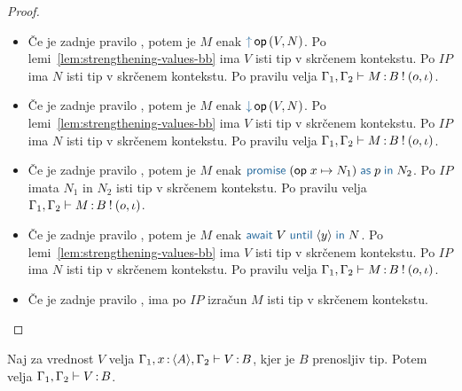 \begin{proof}
\begin{itemize}
		\item Če je zadnje pravilo , potem je $M$ enak $\tmopout{op}{V}{N}$.
		Po lemi~\ref{lem:strengthening-values-bb} ima $V$ isti tip v skrčenem kontekstu.
		Po $IP$ ima $N$ isti tip v skrčenem kontekstu.
		Po pravilu  velja $\Gamma_1, \Gamma_2 \vdash M \mathinner{:} B \mathbin{!} (o, \iota)$.
		
		\item Če je zadnje pravilo , potem je $M$ enak $\tmopin{op}{V}{N}$.
		Po lemi~\ref{lem:strengthening-values-bb} ima $V$ isti tip v skrčenem kontekstu.
		Po $IP$ ima $N$ isti tip v skrčenem kontekstu.
		Po pravilu  velja $\Gamma_1, \Gamma_2 \vdash M \mathinner{:} B \mathbin{!} (o, \iota)$.
		
		\item Če je zadnje pravilo , potem je $M$ enak $\tmwith{op}{x}{N_1}{p}{N_2}$.
		Po $IP$ imata $N_1$ in $N_2$ isti tip v skrčenem kontekstu.
		Po pravilu  velja $\Gamma_1, \Gamma_2 \vdash M \mathinner{:} B \mathbin{!} (o, \iota)$.
		
		\item Če je zadnje pravilo , potem je $M$ enak $\tmawait{V}{y}{N}$.
		Po lemi~\ref{lem:strengthening-values-bb} ima $V$ isti tip v skrčenem kontekstu.
		Po $IP$ ima $N$ isti tip v skrčenem kontekstu.
		Po pravilu  velja $\Gamma_1, \Gamma_2 \vdash M \mathinner{:} B \mathbin{!} (o, \iota)$.
		
		\item Če je zadnje pravilo , ima po $IP$ izračun $M$ isti tip v skrčenem kontekstu.
		
	\end{itemize}
\end{proof}

\begin{lema}\label{lem:tovor-osnovni-tip-skrcitev-2}
	Naj za vrednost $V$ velja $\Gamma_1, x \mathinner{:} \langle A \rangle, \Gamma_2 \vdash V \mathinner{:} B$, kjer je $B$ prenosljiv tip. Potem velja $\Gamma_1, \Gamma_2 \vdash V \mathinner{:} B$.
\end{lema}

